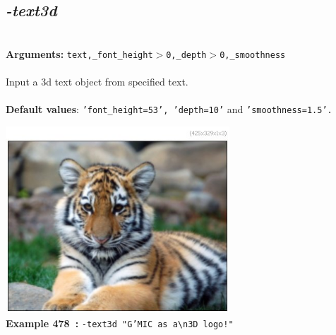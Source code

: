 \documentclass[a4paper,11pt,twoside]{book}
\begin{document}
\subsection{\emph{-text3d} }\vspace*{-0.5em}
~\\\textbf{Arguments: } 
{\small \texttt{text,\_font\_height$>$0,\_depth$>$0,\_smoothness}}\\~\\
Input a 3d text object from specified text.
~\\~\\\textbf{Default values}: {\small \texttt{'font\_height=53', 'depth=10'} and \texttt{'smoothness=1.5'.}}
\begin{center}\includegraphics[keepaspectratio=true,height=7cm,width=\textwidth]{img/gmic_def478.jpg}\\
{\footnotesize \textbf{Example 478~:} \texttt{-text3d "G'MIC as a\textbackslash n3D logo!"}}
\end{center}
\end{document}

